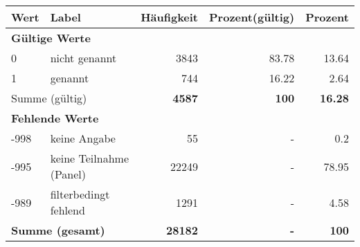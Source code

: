      \begin{longtable}{lXrrr}
     \toprule
     \textbf{Wert} & \textbf{Label} & \textbf{Häufigkeit} & \textbf{Prozent(gültig)} & \textbf{Prozent} \\
     \endhead
     \midrule
     \multicolumn{5}{l}{\textbf{Gültige Werte}}\\

     0 &
     \multicolumn{1}{X}{ nicht genannt   } &


       \num{3843} &
       \num[round-mode=places,round-precision=2]{83.78} &
         \num[round-mode=places,round-precision=2]{13.64} \\

     1 &
     \multicolumn{1}{X}{ genannt   } &


       \num{744} &
       \num[round-mode=places,round-precision=2]{16.22} &
         \num[round-mode=places,round-precision=2]{2.64} \\
     \midrule
     \multicolumn{2}{l}{Summe (gültig)} &
       \textbf{\num{4587}} &
     \textbf{100} &
       \textbf{\num[round-mode=places,round-precision=2]{16.28}} \\
     \multicolumn{5}{l}{\textbf{Fehlende Werte}}\\
       -998 &
       keine Angabe &
         \num{55} &
        - &
         \num[round-mode=places,round-precision=2]{0.2} \\
       -995 &
       keine Teilnahme (Panel) &
         \num{22249} &
        - &
         \num[round-mode=places,round-precision=2]{78.95} \\
       -989 &
       filterbedingt fehlend &
         \num{1291} &
        - &
         \num[round-mode=places,round-precision=2]{4.58} \\
     \midrule
     \multicolumn{2}{l}{\textbf{Summe (gesamt)}} &
          \textbf{\num{28182}} &
        \textbf{-} &
        \textbf{100} \\
     \bottomrule
     \end{longtable}
     
